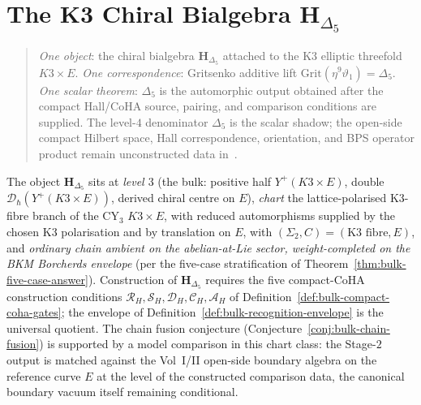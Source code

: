 \chapter{The K3 Chiral Bialgebra \texorpdfstring{$\mathbf{H}_{\Delta_5}$}{H-Delta-5}}
\label{ch:k3-chiral-bialgebra-platonic}

\begin{quote}\small
\emph{One object}: the chiral bialgebra $\mathbf{H}_{\Delta_5}$ attached to the K3
elliptic threefold $K3\times E$. \emph{One correspondence}: Gritsenko additive lift
$\mathrm{Grit}(\eta^{9}\vartheta_1)=\Delta_5$. \emph{One scalar theorem}:
$\Delta_5$ is the automorphic output obtained after the compact Hall/CoHA
source, pairing, and comparison conditions are supplied. The level-$4$
denominator $\Delta_5$ is the scalar shadow; the open-side compact
Hilbert space, Hall correspondence, orientation, and BPS operator
product remain unconstructed data
in~\cite{LorgatIgusaCuspForm}.
\end{quote}

\begin{remark}
\label{rem:k3-chiral-bialgebra-three-axis-coords}
The object $\mathbf{H}_{\Delta_5}$ sits at \emph{level $3$}
(the bulk: positive half $Y^{+}(K3 \times E)$, double
$\mathcal D_\hbar(Y^{+}(K3 \times E))$, derived chiral centre on $E$),
\emph{chart} the lattice-polarised K3-fibre branch of the
CY$_3$ $K3 \times E$, with reduced automorphisms supplied by the
chosen K3 polarisation and by translation on $E$, with
$(\Sigma_2, C) = (\text{K3 fibre}, E)$,
and \emph{ordinary chain ambient on the abelian-at-Lie sector,
weight-completed on the BKM Borcherds envelope} (per the
five-case stratification of
Theorem~\ref{thm:bulk-five-case-answer}). Construction of
$\mathbf{H}_{\Delta_5}$ requires the five compact-CoHA construction
conditions $\mathcal R_H, \mathcal S_H, \mathcal D_H, \mathcal C_H,
\mathcal A_H$ of Definition~\ref{def:bulk-compact-coha-gates}; the
envelope of Definition~\ref{def:bulk-recognition-envelope}
is the universal quotient. The chain fusion conjecture
(Conjecture~\ref{conj:bulk-chain-fusion}) is supported by a model
comparison in this chart class: the Stage-$2$ output is matched
against the Vol~I/II open-side boundary algebra on the reference
curve $E$ at the level of the constructed comparison data, the
canonical boundary vacuum itself remaining conditional.
\end{remark}

